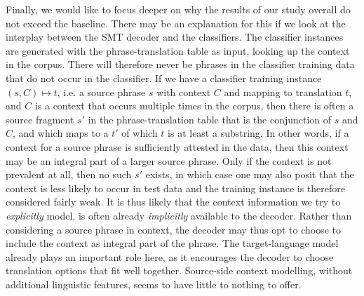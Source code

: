 Finally, we would like to focus deeper on why the results of our study
overall do not exceed the baseline.  There may be an explanation for this
if we look at the interplay between the SMT decoder and the classifiers. The
classifier instances are generated with the phrase-translation table as input,
looking up the context in the corpus. There will therefore never be phrases in
the classifier training data that do not occur in the classifier. If we have a
classifier training instance $(s,C) \mapsto t$, i.e.  a source phrase $s$ with
context $C$ and mapping to translation $t$, and $C$ is a context that occurs
multiple times in the corpus, then there is often a source fragment $s'$ in the
phrase-translation table that is the conjunction of $s$ and $C$, and which maps
to a $t'$ of which $t$ is at least a substring. In other words, if a context
for a source phrase is sufficiently attested in the data, then this context may be
an integral part of a larger source phrase. Only if the context is not
prevalent at all, then no such $s'$ exists, in which case one may also posit
that the context is less likely to occur in test data and the training instance
is therefore considered fairly weak.  It is thus likely that the context
information we try to \emph{explicitly} model, is often already
\emph{implicitly} available to the decoder.  Rather than considering a source
phrase in context, the decoder may thus opt to choose to include the context as
integral part of the phrase.  The target-language model already plays an
important role here, as it encourages the decoder to choose translation options
that fit well together. Source-side context modelling, without additional
linguistic features, seems to have little to nothing to offer.


